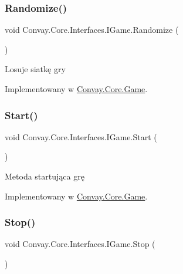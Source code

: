 \subsubsection{\texorpdfstring{Randomize()}{Randomize()}}
{\footnotesize\ttfamily void Convay.\+Core.\+Interfaces.\+I\+Game.\+Randomize (\begin{DoxyParamCaption}{ }\end{DoxyParamCaption})}



Losuje siatkę gry 



Implementowany w \hyperlink{class_convay_1_1_core_1_1_game_a59b58207976ef30b82932d1196806c8f}{Convay.\+Core.\+Game}.

\hypertarget{interface_convay_1_1_core_1_1_interfaces_1_1_i_game_a76cff5d7173fd5c3b7f7959b0e7baa1b}{}\label{interface_convay_1_1_core_1_1_interfaces_1_1_i_game_a76cff5d7173fd5c3b7f7959b0e7baa1b} 
\subsubsection{\texorpdfstring{Start()}{Start()}}
{\footnotesize\ttfamily void Convay.\+Core.\+Interfaces.\+I\+Game.\+Start (\begin{DoxyParamCaption}{ }\end{DoxyParamCaption})}



Metoda startująca grę 



Implementowany w \hyperlink{class_convay_1_1_core_1_1_game_a34947ec8157eabc9eba8d5d8fd116f42}{Convay.\+Core.\+Game}.

\hypertarget{interface_convay_1_1_core_1_1_interfaces_1_1_i_game_a2dec82cc222354ba16ecfa30a0158cac}{}\label{interface_convay_1_1_core_1_1_interfaces_1_1_i_game_a2dec82cc222354ba16ecfa30a0158cac} 
\subsubsection{\texorpdfstring{Stop()}{Stop()}}
{\footnotesize\ttfamily void Convay.\+Core.\+Interfaces.\+I\+Game.\+Stop (\begin{DoxyParamCaption}{ }\end{DoxyParamCaption})}



